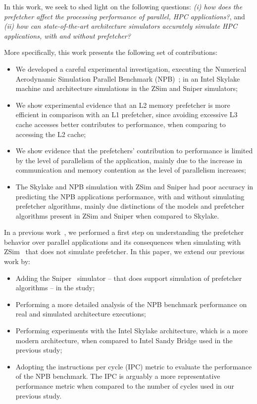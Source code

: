 \documentclass[AMA,final,STIX1COL]{WileyNJD-v2}
\begin{document}
In this work, we seek to shed light on the following questions: \textit{(i) how does the prefetcher affect the processing performance of parallel, HPC applications?}, and \textit{(ii) how can state-of-the-art architecture simulators accurately simulate HPC applications, with and without prefetcher?}

More specifically, this work presents the following set of contributions:
\begin{itemize}
    \item We developed a careful experimental investigation, executing the Numerical Aerodynamic Simulation Parallel Benchmark (NPB)~\cite{jin1999openmp};
    in an Intel Skylake machine and architecture simulations in the ZSim and Sniper simulators; 
    \item We show experimental evidence that an L2 memory prefetcher is more efficient in comparison with an L1 prefetcher, since avoiding excessive L3 cache accesses better contributes to performance, when comparing to accessing the L2 cache;
    \item We show evidence that the prefetchers' contribution to performance is limited by the level of parallelism of the application, mainly due to the increase in communication and memory contention as the level of parallelism increases;
    \item The Skylake and NPB simulation with ZSim and Sniper had poor accuracy in predicting the NPB applications performance, with and without simulating prefetcher algorithms, mainly due distinctions of the models and prefetcher algorithms present in ZSim and Sniper when compared to Skylake.
\end{itemize}

In a previous work~\cite{girelli2019impacto}, we performed a first step on understanding the prefetcher behavior over parallel applications and its consequences when simulating with ZSim~\cite{sanchez2013zsim} that does not simulate prefetcher. In this paper, we extend our previous work by:

\begin{itemize}
    \item Adding the Sniper~\cite{carlson2014aeohmcm} simulator -- that does support simulation of prefetcher algorithms -- in the study;
    \item Performing a more detailed analysis of the NPB benchmark performance on real and simulated architecture executions;
    \item Performing experiments with the Intel Skylake architecture, which is a more modern architecture, when compared to Intel Sandy Bridge used in the previous study;
    \item Adopting the instructions per cycle (IPC) metric to evaluate the performance of the NPB benchmark. The IPC is arguably a more representative performance metric when compared to the number of cycles used in our previous study.
\end{itemize}
\end{document}
